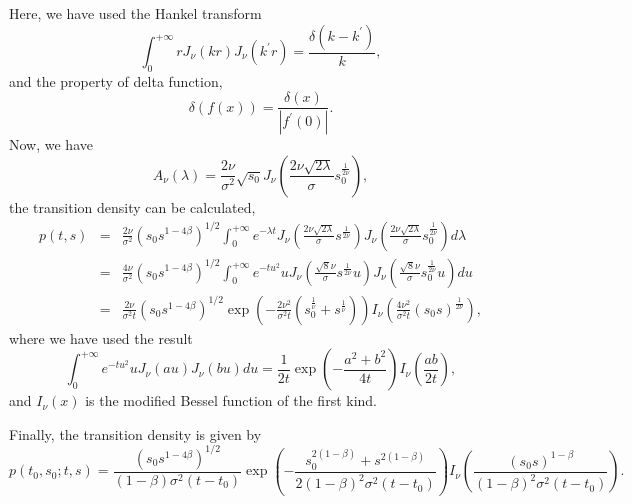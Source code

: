 \documentclass[12pt]{article}
\begin{document}
  Here, we have used the Hankel transform
  \begin{equation}
    \int_0^{+\infty}rJ_{\nu}(kr)J_{\nu}(k^{\prime}r)=\frac{\delta(k-k^{\prime})}{k},
  \end{equation}
  and the property of delta function,
  \begin{equation}
    \delta\left(f(x)\right)=\frac{\delta(x)}{|f^{\prime}(0)|}.
  \end{equation}
  Now, we have
  $$
    A_{\nu}(\lambda)=\frac{2\nu}{\sigma^2}\sqrt{s_0}J_{\nu}\left(\frac{2\nu\sqrt{2\lambda}}{\sigma}s_0^{\frac{1}{2\nu}}\right),
  $$
  the transition density can be calculated,
  \begin{eqnarray}
    p(t,s) &=& \frac{2\nu}{\sigma^2}\left(s_0s^{1-4\beta}\right)^{1/2}\int_0^{+\infty}e^{-\lambda t}
                J_{\nu}\left(\frac{2\nu\sqrt{2\lambda}}{\sigma}s^{\frac{1}{2\nu}}\right)
                J_{\nu}\left(\frac{2\nu\sqrt{2\lambda}}{\sigma}s_0^{\frac{1}{2\nu}}\right)d\lambda\nonumber\\
           &=& \frac{4\nu}{\sigma^2}\left(s_0s^{1-4\beta}\right)^{1/2}\int_0^{+\infty}e^{-tu^2} u
                J_{\nu}\left(\frac{\sqrt{8}\nu}{\sigma}s^{\frac{1}{2\nu}}u\right)
                J_{\nu}\left(\frac{\sqrt{8}\nu}{\sigma}s_0^{\frac{1}{2\nu}}u\right)du\nonumber\\
           &=& \frac{2\nu}{\sigma^2t}\left(s_0s^{1-4\beta}\right)^{1/2}
               \exp\left(-\frac{2\nu^2}{\sigma^2t}\left(s_0^{\frac{1}{\nu}}+s^{\frac{1}{\nu}}\right)\right)
               I_{\nu}\left(\frac{4\nu^2}{\sigma^2t}\left(s_0s\right)^{\frac{1}{2\nu}}\right),
  \end{eqnarray}
  where we have used the result \cite{DLMF1}
  \begin{equation}
    \int_0^{+\infty}e^{-tu^2}uJ_{\nu}(au)J_{\nu}(bu)du=\frac{1}{2t}\exp\left(-\frac{a^2+b^2}{4t}\right)I_{\nu}\left(\frac{ab}{2t}\right),
  \end{equation}
  and $I_{\nu}(x)$ is the modified Bessel function of the first kind.

  Finally, the transition density is given by
  \begin{equation}
    p(t_0,s_0;t,s)=\frac{\left(s_0s^{1-4\beta}\right)^{1/2}}{(1-\beta)\sigma^2(t-t_0)}
    \exp\left(-\frac{s_0^{2(1-\beta)}+s^{2(1-\beta)}}{2(1-\beta)^2\sigma^2(t-t_0)}\right)
    I_{\nu}\left(\frac{\left(s_0s\right)^{1-\beta}}{(1-\beta)^2\sigma^2(t-t_0)}\right).
    \label{density1}
  \end{equation}
\end{document}
